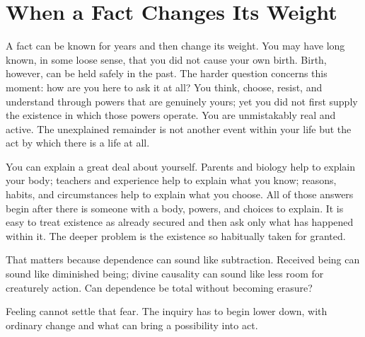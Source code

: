 \section{When a Fact Changes Its Weight}

A fact can be known for years and then change its weight. You may have long known, in some loose sense, that you did not cause your own birth. Birth, however, can be held safely in the past. The harder question concerns this moment: how are you here to ask it at all? You think, choose, resist, and understand through powers that are genuinely yours; yet you did not first supply the existence in which those powers operate. You are unmistakably real and active. The unexplained remainder is not another event within your life but the act by which there is a life at all.

You can explain a great deal about yourself. Parents and biology help to explain your body; teachers and experience help to explain what you know; reasons, habits, and circumstances help to explain what you choose. All of those answers begin after there is someone with a body, powers, and choices to explain. It is easy to treat existence as already secured and then ask only what has happened within it. The deeper problem is the existence so habitually taken for granted.

That matters because dependence can sound like subtraction. Received being can sound like diminished being; divine causality can sound like less room for creaturely action. Can dependence be total without becoming erasure?

Feeling cannot settle that fear. The inquiry has to begin lower down, with ordinary change and what can bring a possibility into act.
